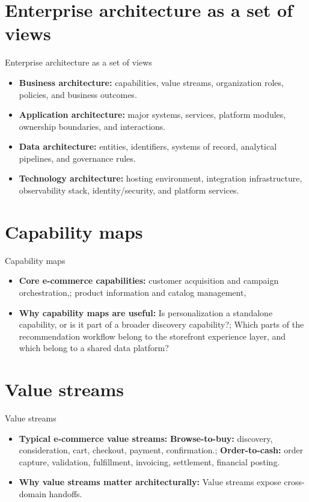 \documentclass[aspectratio=169]{beamer}
\begin{document}
\section{Enterprise architecture as a set of views}

\begin{frame}{Enterprise architecture as a set of views}
  \begin{itemize}
    \item \textbf{Business architecture:} capabilities, value streams, organization roles, policies, and business outcomes.
    \item \textbf{Application architecture:} major systems, services, platform modules, ownership boundaries, and interactions.
    \item \textbf{Data architecture:} entities, identifiers, systems of record, analytical pipelines, and governance rules.
    \item \textbf{Technology architecture:} hosting environment, integration infrastructure, observability stack, identity/security, and platform services.
  \end{itemize}
\end{frame}

\section{Capability maps}

\begin{frame}{Capability maps}
  \begin{itemize}
    \item \textbf{Core e-commerce capabilities:} customer acquisition and campaign orchestration,; product information and catalog management,
    \item \textbf{Why capability maps are useful:} Is personalization a standalone capability, or is it part of a broader discovery capability?; Which parts of the recommendation workflow belong to the storefront experience layer, and which belong to a shared data platform?
  \end{itemize}
\end{frame}

\section{Value streams}

\begin{frame}{Value streams}
  \begin{itemize}
    \item \textbf{Typical e-commerce value streams:} \textbf{Browse-to-buy:} discovery, consideration, cart, checkout, payment, confirmation.; \textbf{Order-to-cash:} order capture, validation, fulfillment, invoicing, settlement, financial posting.
    \item \textbf{Why value streams matter architecturally:} Value streams expose cross-domain handoffs.
  \end{itemize}
\end{frame}
\end{document}
